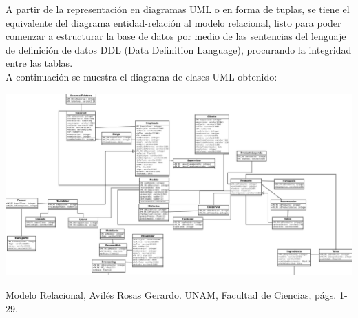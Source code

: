 \documentclass[11pt,letterpaper]{article}
\begin{document}
A partir de la representación en diagramas UML o en forma de tuplas, se tiene el equivalente del diagrama entidad-relación al modelo relacional, listo
para poder comenzar a estructurar la base de datos por medio de las sentencias del lenguaje de definición de datos DDL (Data Definition Language), procurando la integridad entre las tablas.\\

A continuación se muestra el diagrama de clases UML obtenido:

\newpage
\begin{landscape}

\begin{center}
\begin{minipage}{.8\linewidth}
\includegraphics[scale=0.22]{UML_no_normalizado.png}
\end{minipage}
\end{center}

\end{landscape}
 \begin{thebibliography}{1}


Modelo Relacional, Avilés Rosas Gerardo. UNAM, Facultad de Ciencias,
págs. 1-29.

  \end{thebibliography}
\end{document}
